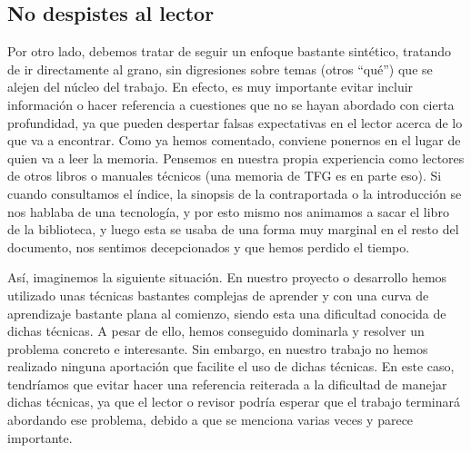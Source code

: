 \subsection{No despistes al lector}
Por otro lado, debemos tratar de seguir un enfoque bastante sintético, tratando de ir directamente al grano, sin digresiones sobre temas (otros ``qué'') que  se alejen del núcleo del trabajo. En efecto, es muy importante evitar incluir información o hacer referencia a cuestiones que no se hayan abordado con cierta profundidad, ya que pueden despertar falsas expectativas en el lector acerca de lo que va a encontrar. Como ya hemos comentado, conviene ponernos en el lugar de quien va a leer la memoria. Pensemos en nuestra propia experiencia como lectores de otros libros o manuales técnicos (una memoria de TFG es en parte eso). Si cuando consultamos el índice, la sinopsis de la contraportada o la introducción se nos hablaba de una tecnología, y por esto mismo nos animamos a sacar el libro de la biblioteca, y luego esta se usaba de una forma muy marginal en el resto del documento, nos sentimos decepcionados y que hemos perdido el tiempo.

Así, imaginemos la siguiente situación. En nuestro proyecto o desarrollo hemos utilizado unas técnicas bastantes complejas de aprender y con una curva de aprendizaje bastante plana al comienzo, siendo esta una dificultad conocida de dichas técnicas. A pesar de ello, hemos conseguido dominarla y resolver un problema concreto e interesante. Sin embargo, en nuestro trabajo no hemos realizado ninguna aportación que facilite el uso de dichas técnicas. En este caso, tendríamos que evitar hacer una referencia reiterada a la dificultad de manejar dichas técnicas, ya que el lector o revisor podría esperar que el trabajo terminará abordando ese problema, debido a que  se menciona varias veces y parece importante.


